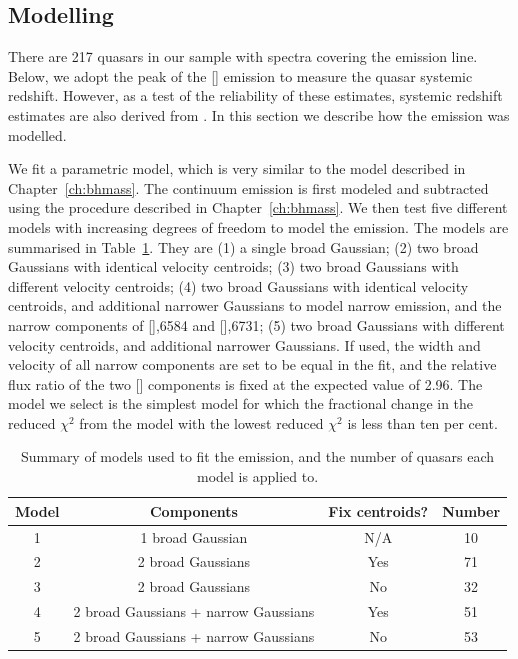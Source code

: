 \subsection{Modelling \hans}

There are 217 quasars in our sample with spectra covering the \ha emission line. 
Below, we adopt the peak of the [] emission to measure the quasar systemic redshift. 
However, as a test of the reliability of these estimates, systemic redshift estimates are also derived from \ha. 
In this section we describe how the \ha emission was modelled. 

We fit a parametric model, which is very similar to the model described in Chapter~\ref{ch:bhmass}. 
The continuum emission is first modeled and subtracted using the procedure described in Chapter~\ref{ch:bhmass}. 
We then test five different models with increasing degrees of freedom to model the \ha emission. 
The models are summarised in Table~\ref{tab:hamod}. 
They are (1) a single broad Gaussian; (2) two broad Gaussians with identical velocity centroids; (3) two broad Gaussians with different velocity centroids; (4) two broad Gaussians with identical velocity centroids, and additional narrower Gaussians to model narrow \ha emission, and the narrow components of [],6584 and [],6731; (5) two broad Gaussians with different velocity centroids, and additional narrower Gaussians. 
If used, the width and velocity of all narrow components are set to be equal in the fit, and the relative flux ratio of the two [] components is fixed at the expected value of 2.96.
The model we select is the simplest model for which the fractional change in the reduced $\chi^2$ from the model with the lowest reduced $\chi^2$ is less than ten per cent. 

\begin{table}
  \centering
  \small 
  \caption{Summary of models used to fit the \ha emission, and the number of quasars each model is applied to.}
  \label{tab:hamod}
    \begin{tabular}{cccc} 
    \hline
    Model     & Components & Fix centroids? & Number \\
    \hline
    1        & 1 broad Gaussian  & N/A &  10 \\
    2        & 2 broad Gaussians & Yes &  71 \\
    3        & 2 broad Gaussians & No  &  32 \\
    4        & 2 broad Gaussians + narrow Gaussians & Yes & 51 \\
    5        & 2 broad Gaussians + narrow Gaussians & No  & 53 \\
    \hline
    \end{tabular}
\end{table} 


